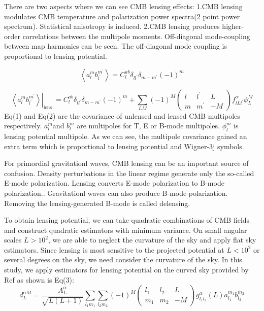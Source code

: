\documentclass[12pt, notitlepage, onecolumn, amsmath, amssymb, aps]{revtex4-1}
\begin{document}
There are two aspects where we can see CMB lensing effects:
1.CMB lensing modulates CMB temperature and polarization power spectra(2 point power spectrum). Statistical anisotropy is induced.
2.CMB lensing produces higher-order correlations between the multipole moments. Off-diagonal mode-coupling between map harmonics can be seen. The off-diagonal mode coupling is proportional to lensing potential.\cite{Hu:2001kj}

\begin{equation}
  \left\langle a_{l}^{m} b_{l^{\prime}}^{m^{\prime}}\right\rangle= C_{l}^{a b} \delta_{l l^{\prime}} \delta_{m-m^{\prime}}(-1)^{m}
\end{equation}

\begin{equation}
  \left.\left\langle a_{l}^{m} b_{l^{\prime}}^{m^{\prime}}\right\rangle\right|_{\text {lens }}=C_{l}^{a b} \delta_{l l^{\prime}} \delta_{m-m^{\prime}}(-1)^{m}+\sum_{L M}(-1)^{M}\left(\begin{array}{ccc}
{l} & {l^{\prime}} & {L} \\
{m} & {m^{\prime}} & {-M}
\end{array}\right) f_{l L l^{\prime}}^{\alpha} \phi_{L}^{M}
\end{equation}
Eq(1) and Eq(2) are the covariance of unlensed and lensed CMB multipoles respectively. \(a_{l}^{m} \)and \(b_{l}^{m} \)  are multipoles for T, E or B-mode multipoles. \(\phi_{l}^{m}\) is lensing potential multipole. As we can see, the multipole covariance gained an extra term which is proportional to lensing potential and Wigner-3j symbols. 

For primordial gravitationl waves, CMB lensing can be an important source of confusion\cite{Lewis:2006fu}. Density perturbations in the linear regime generate only the so-called E-mode polarization\cite{Kamionkowski:1996ks}. Lensing converts E-mode polarization to B-mode polarization.\cite{Zaldarriaga:1998ar}. Gravitationl waves can also produce B-mode polarization\cite{Hu:2000ee}. Removing the lensing-generated B-mode is called delensing.

To obtain lensing potential, we can take quadratic combinations of CMB fields and construct quadratic estimators with minimum variance\cite{Hu:2000ee}. On small angular scales \(L>10^2\), we are able to neglect the curvature of the sky and apply flat sky estimators\cite{Hu:2001kj}. Since lensing is most sensitive to the projected potential at \(L<10^2\) or several degrees on the sky, we need consider the curvature of the sky. In this study, we apply estimators for lensing potential on the curved sky provided by Ref\cite{Okamoto:2003zw} as shown is Eq(3):
\begin{equation}
  d_{L}^{\alpha M}=\frac{A_{L}^{\alpha}}{\sqrt{L(L+1)}} \sum_{l_{1} m_{1}} \sum_{l_{2} m_{2}}(-1)^{M}\left(\begin{array}{ccc}
{l_{1}} & {l_{2}} & {L} \\
{m_{1}} & {m_{2}} & {-M}
\end{array}\right) g_{l_{1} l_{2}}^{\alpha}(L) a_{l_{1}}^{m_{1}} b_{l_{2}}^{m_{2}}
\end{equation}
\end{document}
